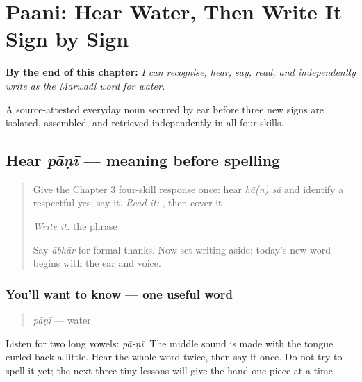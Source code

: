
\chapter{Paani: Hear Water, Then Write It Sign by Sign}
\label{ch:mw-paani}

\begin{chapteropening}
\textbf{By the end of this chapter:} \emph{I can recognise, hear, say, read, and independently write  as the Marwadi word for water.}

A source-attested everyday noun secured by ear before three new signs are isolated, assembled, and retrieved independently in all four skills.
\end{chapteropening}

\section[pāṇī]{Hear \emph{pāṇī} — meaning before spelling}

\label{lesson:MW-C04-hear-paani}



\begin{quote}
Give the Chapter 3 four-skill response once: hear \emph{hā(n) sā} and identify a respectful yes; say it. \emph{Read it:} \textbf{ }, then cover it

\emph{Write it:} the phrase

Say \emph{ābhār} for formal thanks. Now set writing aside: today's new word begins with the ear and voice.
\end{quote}

\subsection*{You'll want to know — one useful word}
\begin{quote}
\emph{pāṇī} — water
\end{quote}

Listen for two long vowels: \emph{pā-ṇī}. The middle sound is made with the tongue curled back a little. Hear the whole word twice, then say it once. Do not try to spell it yet; the next three tiny lessons will give the hand one piece at a time.

